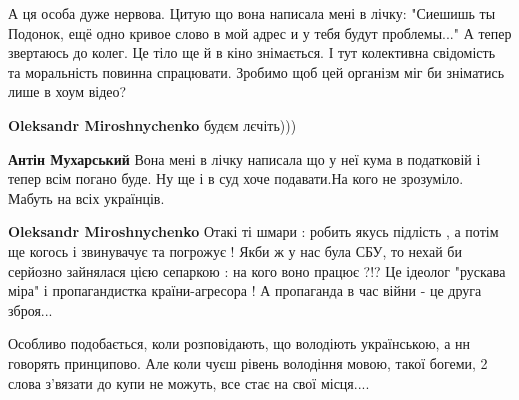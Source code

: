 \begin{itemize}
А ця особа дуже нервова. Цитую що вона написала мені в лічку: "Сиешишь ты
Подонок, ещё одно кривое слово в мой адрес и у тебя будут проблемы..." А тепер
звертаюсь до колег. Це тіло ще й в кіно знімається. І тут колективна свідомість
та моральність повинна спрацювати. Зробимо щоб цей організм міг би зніматись
лише в хоум відео?

\begin{itemize}
 

\textbf{Oleksandr Miroshnychenko} будєм лєчіть)))
\begin{itemize}
 
\textbf{Антін Мухарський} Вона мені в лічку написала що у неї кума в податковій
і тепер всім погано буде. Ну ще і в суд хоче подавати.На кого не зрозуміло.
Мабуть на всіх українців.

 
\textbf{Oleksandr Miroshnychenko} Отакі ті шмари : робить якусь підлість , а
потім ще когось і звинувачує та погрожує ! Якби ж у нас була СБУ, то нехай би
серйозно зайнялася цією сепаркою : на кого воно працює ?!? Це ідеолог "рускава
міра" і пропагандистка країни-агресора ! А пропаганда в час війни - це друга
зброя...
\end{itemize}

\end{itemize}

 

Особливо подобається, коли розповідають, що володіють українською, а нн говорять
принципово. Але коли чуєш рівень володіння мовою, такої богеми, 2 слова з'вязати
до купи не можуть, все стає на свої місця....



\end{itemize}
